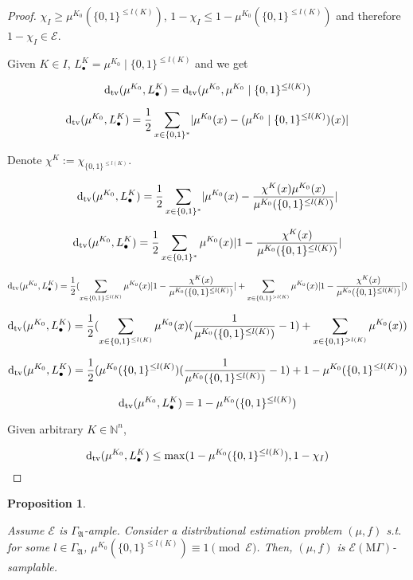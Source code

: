 \documentclass{article}
\numberwithin{equation}{section}
\theoremstyle{definition}
\theoremstyle{plain}
\newtheorem{proposition}{Proposition}[section]
\newcommand{\Bool}{\{0,1\}}
\newcommand{\Words}{{\Bool^*}}
\newcommand{\WordsLen}[1]{{\Bool^{#1}}}
\newcommand{\Dtv}{\operatorname{d}_{\textnormal{tv}}}
\newcommand{\Nats}{\mathbb{N}}
\newcommand{\Abs}[1]{\lvert #1 \rvert}
\newcommand{\GrowA}{\Gamma_{\mathfrak{A}}}
\newcommand{\MGrow}{\mathrm{M}\Gamma}
\newcommand{\Fall}{\mathcal{E}}
\newcommand{\EMG}{\Fall(\MGrow)}
\begin{document}
\begin{proof}

$\chi_I \geq \mu^{K_0}(\Bool^{\leq l(K)})$, $1 - \chi_{I} \leq 1 - \mu^{K_0}(\Bool^{\leq l(K)})$ and therefore $1 - \chi_I \in \Fall$.

Given $K \in I$, ${L_\bullet^K = \mu^{K_0} \mid \Bool^{\leq l(K)}}$ and we get

$$\Dtv(\mu^{K_0}, L_\bullet^K) = \Dtv(\mu^{K_0}, \mu^{K_0} \mid \Bool^{\leq l(K)})$$

$$\Dtv(\mu^{K_0}, L_\bullet^K) = \frac{1}{2} \sum_{x \in \Words} \Abs{\mu^{K_0}(x)-(\mu^{K_0} \mid \WordsLen{\leq l(K)})(x)}$$

Denote $\chi^K:=\chi_{\WordsLen{\leq l(K)}}$.

$$\Dtv(\mu^{K_0}, L_\bullet^K) = \frac{1}{2} \sum_{x \in \Words} \Abs{\mu^{K_0}(x)-\frac{\chi^K(x)\mu^{K_0}(x)}{\mu^{K_0}(\WordsLen{\leq l(K)})}}$$

$$\Dtv(\mu^{K_0}, L_\bullet^K) = \frac{1}{2} \sum_{x \in \Words} \mu^{K_0}(x) \Abs{1-\frac{\chi^K(x)}{\mu^{K_0}(\Bool^{\leq l(K)})}}$$

$$\Dtv(\mu^{K_0}, L_\bullet^K) = \frac{1}{2} (\sum_{x \in \Bool^{\leq l(K)}} \mu^{K_0}(x) \Abs{1-\frac{\chi^K(x)}{\mu^{K_0}(\Bool^{\leq l(K)})}}+\sum_{x \in \Bool^{>l(K)}} \mu^{K_0}(x) \Abs{1-\frac{\chi^K(x)}{\mu^{K_0}(\Bool^{\leq l(K)})}})$$

$$\Dtv(\mu^{K_0}, L_\bullet^K) = \frac{1}{2} (\sum_{x \in \Bool^{\leq l(K)}} \mu^{K_0}(x)(\frac{1}{\mu^{K_0}(\Bool^{\leq l(K)})}-1)+\sum_{x \in \Bool^{>l(K)}} \mu^{K_0}(x))$$

$$\Dtv(\mu^{K_0}, L_\bullet^K) = \frac{1}{2} (\mu^{K_0}(\Bool^{\leq l(K)})(\frac{1}{\mu^{K_0}(\Bool^{\leq l(K)})}-1)+1 - \mu^{K_0}(\Bool^{\leq l(K)}))$$

$$\Dtv(\mu^{K_0}, L_\bullet^K) = 1-\mu^{K_0}(\Bool^{\leq l(K)})$$

Given arbitrary $K \in \Nats^n$,

$$\Dtv(\mu^{K_0}, L_\bullet^K) \leq \max(1-\mu^{K_0}(\Bool^{\leq l(K)}), 1-\chi_I)$$
\end{proof}

\begin{samepage}
\begin{proposition}
\label{prp:adv_mgamma_gen}

Assume $\Fall$ is $\GrowA$-ample. Consider a distributional estimation problem $(\mu,f)$ s.t. for some $l \in \GrowA$, $\mu^{K_0}(\Bool^{\leq l(K)}) \equiv 1 \pmod \Fall$. Then, $(\mu,f)$ is $\EMG$-samplable. 

\end{proposition}
\end{samepage}
\end{document}
